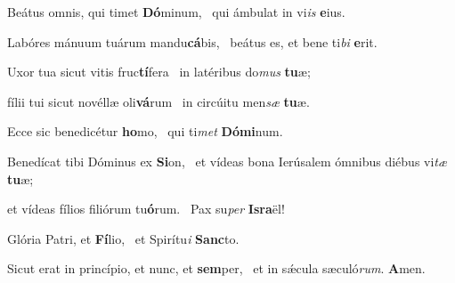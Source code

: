 \item Beátus omnis, qui timet \textbf{Dó}minum,~\psstar{} qui ámbulat in vi\textit{is} \textbf{e}ius.

\item Labóres mánuum tuárum mandu\textbf{cá}bis,~\psstar{} beátus es, et bene ti\textit{bi} \textbf{e}rit.

\item Uxor tua sicut vitis fruc\textbf{tí}fera~\psstar{} in latéribus do\textit{mus} \textbf{tu}æ;

\item fílii tui sicut novéllæ oli\textbf{vá}rum~\psstar{} in circúitu men\textit{sæ} \textbf{tu}æ.

\item Ecce sic benedicétur \textbf{ho}mo,~\psstar{} qui ti\textit{met} \textbf{Dó}\textbf{mi}num.

\item Benedícat tibi Dóminus ex \textbf{Si}on,~\psstar{} et vídeas bona Ierúsalem ómnibus diébus vi\textit{tæ} \textbf{tu}æ;

\item et vídeas fílios filiórum tu\textbf{ó}rum.~\psstar{} Pax su\textit{per} \textbf{Is}\textbf{ra}ël!

\item Glória Patri, et \textbf{Fí}lio,~\psstar{} et Spirítu\textit{i} \textbf{Sanc}to.

\item Sicut erat in princípio, et nunc, et \textbf{sem}per,~\psstar{} et in sǽcula sæculó\textit{rum}. \textbf{A}men.